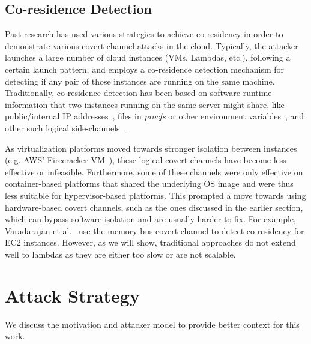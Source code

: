 \subsection{Co-residence Detection}
\label{sec:background:pastwork}

 Past research has used various strategies to achieve co-residency in order 
to demonstrate various covert channel attacks in the cloud. Typically, the
attacker launches a large number of cloud instances (VMs, Lambdas, etc.),
following a certain launch pattern, and employs a co-residence detection
mechanism for detecting if any pair of those instances are running on the same
machine. Traditionally, co-residence detection has been based on software
runtime information that two instances running on the same server might share,
like public/internal IP addresses~\cite{ristenpartccs2009}, files in
\textit{procfs} or other environment
variables~\cite{wangusenix2018,wuusenix2012}, and other such logical
side-channels~\cite{varad191016,vmplacement}.

As virtualization platforms moved towards stronger isolation between instances (e.g.
AWS' Firecracker VM~\cite{firecracker}), these logical covert-channels have
become less effective or infeasible. Furthermore, some of these channels were
only effective on container-based platforms that shared the underlying OS image
and were thus less suitable for hypervisor-based platforms.  This prompted a
move towards using hardware-based covert channels, such as the ones discussed in
the earlier section, which can bypass software isolation and are usually harder
to fix. For example, Varadarajan et al.~\cite{varadarajan2015} use the memory
bus covert channel to detect co-residency for EC2 instances.  However, as we
will show, traditional approaches do not extend well to lambdas as they are either too
slow or are not scalable. 


\section{Attack Strategy}
\label{sec:attackstrategy}
We discuss the motivation and attacker model to provide better context for this
work. 


